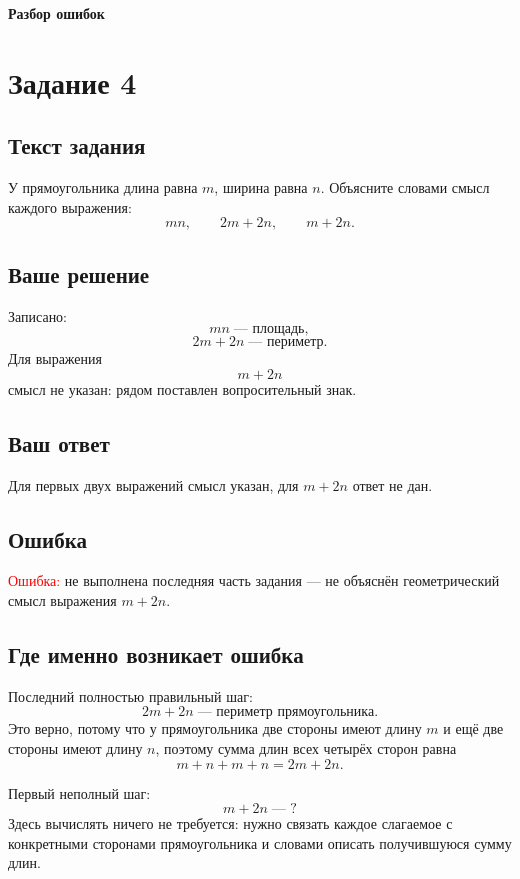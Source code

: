 \documentclass[12pt,a4paper]{article}
\begin{document}
\newpage
\vspace*{\fill}
\begin{center}
{\LARGE\bfseries Разбор ошибок}
\end{center}
\vspace*{\fill}
\newpage

\label{task:4}
\section*{Задание 4}

\subsection*{Текст задания}
У прямоугольника длина равна $m$, ширина равна $n$. Объясните словами смысл каждого выражения:
\[
mn,\qquad 2m+2n,\qquad m+2n.
\]

\subsection*{Ваше решение}
Записано:
\[
mn\;\text{--- площадь},
\]
\[
2m+2n\;\text{--- периметр}.
\]
Для выражения
\[
m+2n
\]
смысл не указан: рядом поставлен вопросительный знак.

\subsection*{Ваш ответ}
Для первых двух выражений смысл указан, для $m+2n$ ответ не дан.

\subsection*{Ошибка}
\textcolor{red}{Ошибка:} не выполнена последняя часть задания --- не объяснён геометрический смысл выражения $m+2n$.

\subsection*{Где именно возникает ошибка}
Последний полностью правильный шаг:
\[
2m+2n\;\text{--- периметр прямоугольника}.
\]
Это верно, потому что у прямоугольника две стороны имеют длину $m$ и ещё две стороны имеют длину $n$, поэтому сумма длин всех четырёх сторон равна
\[
m+n+m+n=2m+2n.
\]

Первый неполный шаг:
\[
m+2n\;\text{--- ?}
\]
Здесь вычислять ничего не требуется: нужно связать каждое слагаемое с конкретными сторонами прямоугольника и словами описать получившуюся сумму длин.
\end{document}
